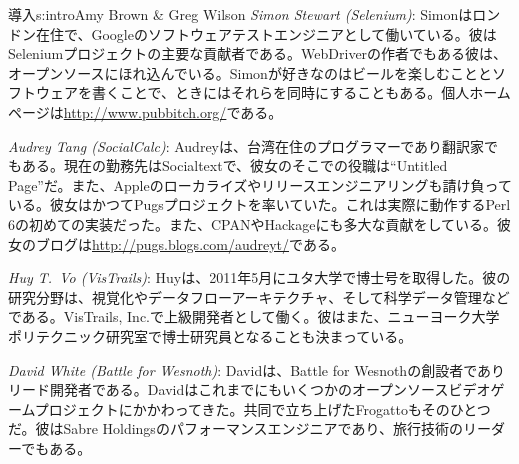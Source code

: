 \begin{aosachapter}{導入}{s:intro}{Amy Brown \& Greg Wilson}
\emph{Simon Stewart (Selenium)}: Simonはロンドン在住で、Googleのソフトウェアテストエンジニアとして働いている。彼はSeleniumプロジェクトの主要な貢献者である。WebDriverの作者でもある彼は、オープンソースにほれ込んでいる。Simonが好きなのはビールを楽しむこととソフトウェアを書くことで、ときにはそれらを同時にすることもある。個人ホームページは\url{http://www.pubbitch.org/}である。

\emph{Audrey Tang (SocialCalc)}: Audreyは、台湾在住のプログラマーであり翻訳家でもある。現在の勤務先はSocialtextで、彼女のそこでの役職は``Untitled Page''だ。また、Appleのローカライズやリリースエンジニアリングも請け負っている。彼女はかつてPugsプロジェクトを率いていた。これは実際に動作するPerl 6の初めての実装だった。また、CPANやHackageにも多大な貢献をしている。彼女のブログは\url{http://pugs.blogs.com/audreyt/}である。


\emph{Huy T.\ Vo (VisTrails)}: Huyは、2011年5月にユタ大学で博士号を取得した。彼の研究分野は、視覚化やデータフローアーキテクチャ、そして科学データ管理などである。VisTrails, Inc.で上級開発者として働く。彼はまた、ニューヨーク大学ポリテクニック研究室で博士研究員となることも決まっている。

\emph{David White (Battle for Wesnoth)}: Davidは、Battle for Wesnothの創設者でありリード開発者である。Davidはこれまでにもいくつかのオープンソースビデオゲームプロジェクトにかかわってきた。共同で立ち上げたFrogattoもそのひとつだ。彼はSabre Holdingsのパフォーマンスエンジニアであり、旅行技術のリーダーでもある。


\end{aosachapter}

